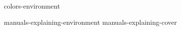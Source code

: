 \startenvironment colors-environment

    \environment manuals-explaining-environment
    \environment manuals-explaining-cover

\stopenvironment

